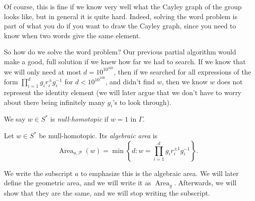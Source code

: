 \documentclass[a4paper]{article}
\DeclareMathOperator\Area{Area}
\begin{document}
\begin{eg}
\begin{center}
  \end{center}
\end{eg}

Of course, this is fine if we know very well what the Cayley graph of the group looks like, but in general it is quite hard. Indeed, solving the word problem is part of what you do if you want to draw the Cayley graph, since you need to know when two words give the same element.

So how do we solve the word problem? Our previous partial algorithm would make a good, full solution if we knew how far we had to search. If we know that we will only need at most $d = 10^{10^{100}}$, then if we searched for all expressions of the form $\prod_{i = 1}^d g_i r_i^{\pm} g_i^{-1}$ for $d < 10^{10^{100}}$, and didn't find $w$, then we know $w$ does not represent the identity element (we will later argue that we don't have to worry about there being infinitely many $g_i$'s to look through).

\begin{defi}
  We say $w \in S^*$ is \emph{null-homotopic} if $w = 1$ in $\Gamma$.
\end{defi}

\begin{defi}
  Let $w \in S^*$ be mull-homotopic. Its \emph{algebraic area} is
  \[
    \Area_{a, \mathcal{P}} (w) = \min \left\{d : w = \prod_{i = 1}^d g_i r_i^{\pm 1} g_i^{-1}\right\}.
  \]
\end{defi}
We write the subscript $a$ to emphasize this is the algebraic area. We will later define the geometric area, and we will write it as $\Area_g$. Afterwards, we will show that they are the same, and we will stop writing the subscript.
\end{document}
